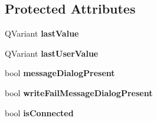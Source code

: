 \subsection*{Protected Attributes}
\begin{DoxyCompactItemize}
\item 
\hypertarget{classQEGenericEdit_a8d40a5e0f2ef98ea5ca57acbd0ed68b1}{
QVariant {\bfseries lastValue}}
\label{classQEGenericEdit_a8d40a5e0f2ef98ea5ca57acbd0ed68b1}

\item 
\hypertarget{classQEGenericEdit_a65637bd64f8990a6f41c010201626f08}{
QVariant {\bfseries lastUserValue}}
\label{classQEGenericEdit_a65637bd64f8990a6f41c010201626f08}

\item 
\hypertarget{classQEGenericEdit_a5c5676a2a611fcbb8626450d584fcbd7}{
bool {\bfseries messageDialogPresent}}
\label{classQEGenericEdit_a5c5676a2a611fcbb8626450d584fcbd7}

\item 
\hypertarget{classQEGenericEdit_a290d7c70baea6277dbcd86d4e8ab4f9d}{
bool {\bfseries writeFailMessageDialogPresent}}
\label{classQEGenericEdit_a290d7c70baea6277dbcd86d4e8ab4f9d}

\item 
\hypertarget{classQEGenericEdit_a4ed3d543eec420b2f5e1bb6af9f86bf6}{
bool {\bfseries isConnected}}
\label{classQEGenericEdit_a4ed3d543eec420b2f5e1bb6af9f86bf6}

\end{DoxyCompactItemize}
